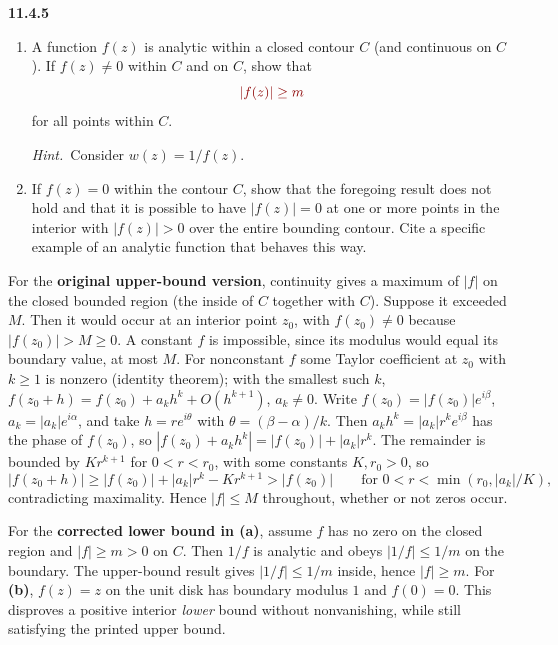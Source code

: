\par\bigskip
\noindent\textbf{11.4.5}\quad
\begin{enumerate}
\item[(a)] A function $f(z)$ is analytic within a closed contour $C$ (and
  continuous on $C$). If $f(z)\neq0$ within $C$ and
   on $C$, show that
  \[
  \erratum{|f(z)|\ge m}
  \]
  for all points within $C$.

  \emph{Hint.}~Consider $w(z)=1/f(z)$.
\item[(b)] If $f(z)=0$ within the contour $C$, show that the foregoing result
  does not hold and that it is possible to have $|f(z)|=0$ at one or more
  points in the interior with $|f(z)|>0$ over the entire bounding contour.
  Cite a specific example of an analytic function that behaves this way.
\end{enumerate}
\solution
{}
For the \textbf{original upper-bound version}, continuity gives a
maximum of $|f|$ on the closed bounded region (the inside of $C$
together with $C$). Suppose it exceeded $M$. Then it would occur at an
interior point $z_0$, with $f(z_0)\ne0$ because $|f(z_0)|>M\ge0$.
A constant $f$ is impossible, since its modulus would equal its
boundary value, at most $M$. For nonconstant $f$ some Taylor
coefficient at $z_0$ with $k\ge1$ is nonzero (identity theorem); with
the smallest such $k$,
$f(z_0+h)=f(z_0)+a_kh^k+O(h^{k+1})$, $a_k\ne0$.
Write $f(z_0)=|f(z_0)|e^{i\beta}$, $a_k=|a_k|e^{i\alpha}$, and take
$h=re^{i\theta}$ with $\theta=(\beta-\alpha)/k$. Then
$a_kh^k=|a_k|r^ke^{i\beta}$ has the phase of $f(z_0)$, so
$|f(z_0)+a_kh^k|=|f(z_0)|+|a_k|r^k$. The remainder is bounded by
$Kr^{k+1}$ for $0<r<r_0$, with some constants $K,r_0>0$, so
\[
|f(z_0+h)|\ge|f(z_0)|+|a_k|r^k-Kr^{k+1}>|f(z_0)|
\qquad\text{for }0<r<\min(r_0,|a_k|/K),
\]
contradicting maximality. Hence
$\boxed{|f|\le M}$ throughout, whether or not zeros occur.

For the \textbf{corrected lower bound in (a)}, assume $f$ has no zero on
the closed region and $|f|\ge m>0$ on $C$. Then $1/f$ is analytic
and obeys $|1/f|\le1/m$ on the boundary. The upper-bound result
gives $|1/f|\le1/m$ inside, hence $|f|\ge m$.
For \textbf{(b)}, $f(z)=z$ on the unit disk has boundary modulus
$1$ and $f(0)=0$. This disproves a positive interior \emph{lower}
bound without nonvanishing, while still satisfying the printed upper bound.

